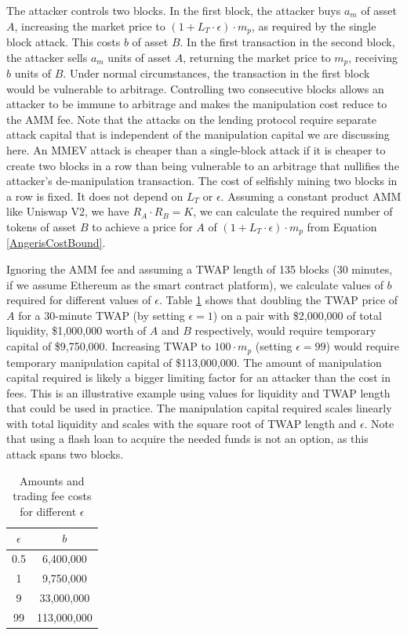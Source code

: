 The attacker controls two blocks. In the first block, the attacker buys $a_m$ of asset $A$, increasing the market price to $(1 + L_T \cdot \epsilon) \cdot m_p$, as required by the single block attack. This costs $b$ of asset $B$. In the first transaction in the second block, the attacker sells $a_m$ units of asset $A$, returning the market price to $m_p$, receiving $b$ units of $B$. Under normal circumstances, the transaction in the first block would be vulnerable to arbitrage. Controlling two consecutive blocks allows an attacker to be immune to arbitrage and makes the manipulation cost reduce to the AMM fee. Note that the attacks on the lending protocol require separate attack capital that is independent of the manipulation capital we are discussing here. An MMEV attack is cheaper than a single-block attack if it is cheaper to create two blocks in a row than being vulnerable to an arbitrage that nullifies the attacker's de-manipulation transaction. The cost of selfishly mining two blocks in a row is fixed. It does not depend on $L_T$ or $\epsilon$. Assuming a constant product AMM like Uniswap V2, we have $R_A \cdot R_B = K$, we can calculate the required number of tokens of asset $B$ to achieve a price for $A$ of $(1 + L_T \cdot \epsilon)\cdot m_p$ from Equation \ref{AngerisCostBound}.

Ignoring the AMM fee and assuming a TWAP length of 135 blocks (30 minutes, if we assume Ethereum as the smart contract platform), we calculate values of $b$ required for different values of $\epsilon$. Table \ref{TableCosts} shows that doubling the TWAP price of $A$ for a 30-minute TWAP (by setting $\epsilon = 1$) on a pair with \$2,000,000 of total liquidity, \$1,000,000 worth of $A$ and $B$ respectively, would require temporary capital of \$9,750,000. Increasing TWAP to $100 \cdot m_p$ (setting $\epsilon = 99$) would require temporary manipulation capital of \$113,000,000. The amount of manipulation capital required is likely a bigger limiting factor for an attacker than the cost in fees. This is an illustrative example using values for liquidity and TWAP length that could be used in practice. The manipulation capital required scales linearly with total liquidity and scales with the square root of TWAP length and $\epsilon$. Note that using a flash loan to acquire the needed funds is not an option, as this attack spans two blocks.

\begin{table}[ht]

\begin{center}
 \begin{tabular}{|c |c|} 
 \hline
 $\epsilon$ & $b$ \\ [0.5ex] 
 \hline\hline
 0.5 & 6,400,000\\ 
 \hline
 1 & 9,750,000\\ 
 \hline
 9 & 33,000,000\\ 
 \hline
 99 & 113,000,000\\  
 \hline
\end{tabular}
\end{center}
\caption{Amounts and trading fee costs for different $\epsilon$}
\label{TableCosts}
\end{table}


